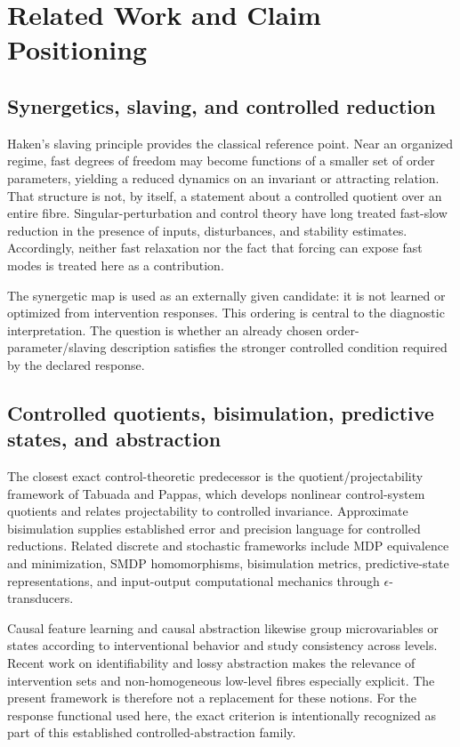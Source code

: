 \section{Related Work and Claim Positioning}

\subsection{Synergetics, slaving, and controlled reduction}

Haken's slaving principle provides the classical reference point.\cite{Haken1996} Near an organized regime, fast degrees of freedom may become functions of a smaller set of order parameters, yielding a reduced dynamics on an invariant or attracting relation. That structure is not, by itself, a statement about a controlled quotient over an entire fibre. Singular-perturbation and control theory have long treated fast-slow reduction in the presence of inputs, disturbances, and stability estimates.\cite{Kokotovic1976,ChristofidesTeel1996} Accordingly, neither fast relaxation nor the fact that forcing can expose fast modes is treated here as a contribution.

The synergetic map is used as an externally given candidate: it is not learned or optimized from intervention responses. This ordering is central to the diagnostic interpretation. The question is whether an already chosen order-parameter/slaving description satisfies the stronger controlled condition required by the declared response.

\subsection{Controlled quotients, bisimulation, predictive states, and abstraction}

The closest exact control-theoretic predecessor is the quotient/projectability framework of Tabuada and Pappas, which develops nonlinear control-system quotients and relates projectability to controlled invariance.\cite{TabuadaPappas2005} Approximate bisimulation supplies established error and precision language for controlled reductions.\cite{GirardPappas2007} Related discrete and stochastic frameworks include MDP equivalence and minimization, SMDP homomorphisms, bisimulation metrics, predictive-state representations, and input-output computational mechanics through $\epsilon$-transducers.\cite{Givan2003,RavindranBarto2003,Ferns2004,Littman2001,BarnettCrutchfield2015}

Causal feature learning and causal abstraction likewise group microvariables or states according to interventional behavior and study consistency across levels.\cite{Chalupka2015,Chalupka2016,Rubenstein2017,BeckersHalpern2019} Recent work on identifiability and lossy abstraction makes the relevance of intervention sets and non-homogeneous low-level fibres especially explicit.\cite{LiKabaRavanbakhsh2025,XiaBareinboim2025,Geiger2025} The present framework is therefore not a replacement for these notions. For the response functional used here, the exact criterion is intentionally recognized as part of this established controlled-abstraction family.

